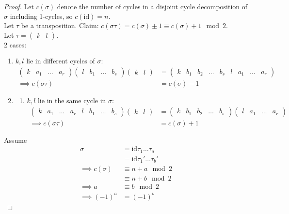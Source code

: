 \begin{proof}
Let \(c(\sigma)\) denote the number of cycles in a disjoint cycle decomposition of \(\sigma\) including 1-cycles, so \(c(\text{id}) = n\).\\
Let \(\tau\) be a transposition.
Claim: \(c(\sigma \tau) = c(\sigma) \pm 1 \equiv c(\sigma) + 1 \mod 2\).\\
Let \(\tau = \begin{pmatrix}k & l\end{pmatrix}\).\\
2 cases:

\begin{enumerate}
\def\labelenumi{\roman{enumi}.}
\item
  \(k, l\) lie in different cycles of \(\sigma\):
  \begin{align*}
   \begin{pmatrix}k & a_1 & \ldots & a_r \end{pmatrix} \begin{pmatrix}l & b_1 & \ldots & b_s \end{pmatrix} \begin{pmatrix} k & l\end{pmatrix}
   &= \begin{pmatrix}k & b_1 & b_2 & \ldots & b_s & l & a_1 & \ldots & a_r \end{pmatrix} \\
   \implies c(\sigma \tau) &= c(\sigma) - 1
  \end{align*}
\item
  \begin{enumerate}
  \def\labelenumii{\roman{enumii}.}
  \tightlist
  \item
    \(k, l\) lie in the same cycle in \(\sigma\):
    \begin{align*}
    \begin{pmatrix}k & a_1 & \ldots & a_r & l & b_1 & \ldots & b_s \end{pmatrix} \begin{pmatrix} k & l\end{pmatrix}
    &= \begin{pmatrix}k & b_1 & b_2 & \ldots & b_s \end{pmatrix} \begin{pmatrix}l & a_1 & \ldots & a_r \end{pmatrix} \\
    \implies c(\sigma \tau) &= c(\sigma) + 1
    \end{align*}
  \end{enumerate}
\end{enumerate}

Assume \begin{align*}
    \sigma &= \text{id} \tau_1 \ldots \tau_a \\
    &= \text{id} \tau_1' \ldots \tau_b' \\
    \implies c(\sigma) &\equiv n + a \mod 2 \\
    &\equiv n + b \mod 2 \\
    \implies a &\equiv b \mod 2 \\
    \implies (-1)^a &= (-1)^b
\end{align*}
\end{proof}

